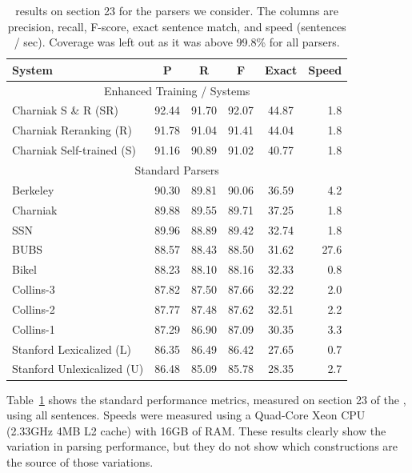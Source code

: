 \begin{table}
\begin{center}
\begin{tabular}{|lccccr|}
	\hline
		System & P & R & F & Exact & Speed \\
	\hline
	\hline
		\multicolumn{6}{|c|}{Enhanced Training / Systems} \\
		Charniak S \& R (SR)       & 92.44 & 91.70 & 92.07 & 44.87 & 1.8 \\
		Charniak Reranking (R)     & 91.78 & 91.04 & 91.41 & 44.04 & 1.8 \\
		Charniak Self-trained (S)  & 91.16 & 90.89 & 91.02 & 40.77 & 1.8 \\
	\hline
		\multicolumn{6}{|c|}{Standard Parsers} \\
		Berkeley                   & 90.30 & 89.81 & 90.06 & 36.59 & 4.2 \\
		Charniak                   & 89.88 & 89.55 & 89.71 & 37.25 & 1.8 \\
		SSN                        & 89.96 & 88.89 & 89.42 & 32.74 & 1.8 \\
		BUBS                       & 88.57 & 88.43 & 88.50 & 31.62 & 27.6 \\
		Bikel                      & 88.23 & 88.10 & 88.16 & 32.33 & 0.8 \\
		Collins-3                  & 87.82 & 87.50 & 87.66 & 32.22 & 2.0 \\
		Collins-2                  & 87.77 & 87.48 & 87.62 & 32.51 & 2.2 \\
		Collins-1                  & 87.29 & 86.90 & 87.09 & 30.35 & 3.3 \\
		Stanford Lexicalized (L)   & 86.35 & 86.49 & 86.42 & 27.65 & 0.7 \\
		Stanford Unlexicalized (U) & 86.48 & 85.09 & 85.78 & 28.35 & 2.7 \\
	\hline
\end{tabular}
\caption[\parseval results on \wsj section 23 for the parsers we consider.]{ \label{tab:standard-results} 
	\parseval results on \wsj section 23 for the parsers we consider.
  The columns are precision, recall, F-score, exact sentence match, and speed (sentences / sec).
  Coverage was left out as it was above 99.8\% for all parsers.
}
\end{center}
\end{table}

Table~\ref{tab:standard-results} shows the standard performance metrics,
measured on section 23 of the \wsj, using all sentences.  Speeds were measured
using a Quad-Core Xeon CPU (2.33GHz 4MB L2 cache) with 16GB of RAM.
These results clearly show the variation in parsing performance, but they do
not show which constructions are the source of those variations.

